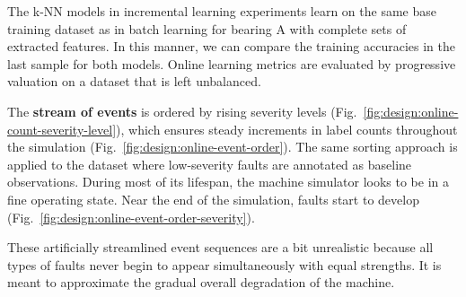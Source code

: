 The k-NN models in incremental learning experiments learn on the same base training dataset as in batch learning for bearing A with complete sets of extracted features. In this manner, we can compare the training accuracies in the last sample for both models. Online learning metrics are evaluated by progressive valuation on a dataset that is left unbalanced.

The \textbf{stream of events} is ordered by rising severity levels (Fig.~\ref{fig:design:online-count-severity-level}), which ensures steady increments in label counts throughout the simulation (Fig.~\ref{fig:design:online-event-order}). The same sorting approach is applied to the dataset where low-severity faults are annotated as baseline observations. During most of its lifespan, the machine simulator looks to be in a fine operating state. Near the end of the simulation, faults start to develop (Fig.~\ref{fig:design:online-event-order-severity}).  

These artificially streamlined event sequences are a bit unrealistic because all types of faults never begin to appear simultaneously with equal strengths. It is meant to approximate the gradual overall degradation of the machine.


